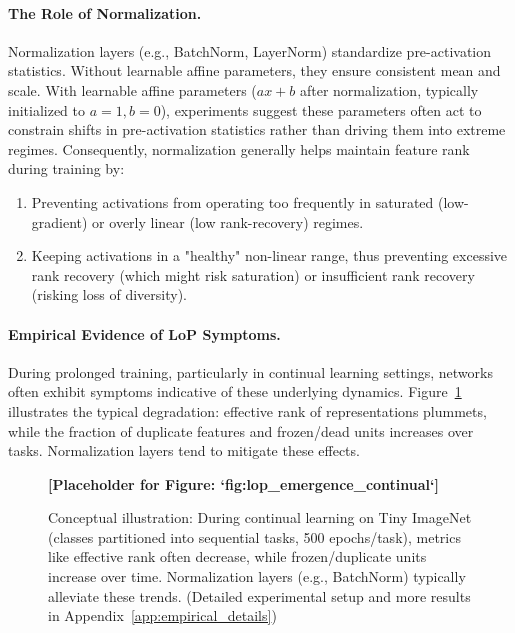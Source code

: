 \documentclass{article}
\begin{document}
\paragraph{The Role of Normalization.}
Normalization layers (e.g., BatchNorm, LayerNorm) standardize pre-activation statistics.
Without learnable affine parameters, they ensure consistent mean and scale. With learnable affine parameters ($ax+b$ after normalization, typically initialized to $a=1, b=0$), experiments suggest these parameters often act to constrain shifts in pre-activation statistics rather than driving them into extreme regimes.
Consequently, normalization generally helps maintain feature rank during training by:
\begin{enumerate}
    \item Preventing activations from operating too frequently in saturated (low-gradient) or overly linear (low rank-recovery) regimes.
    \item Keeping activations in a "healthy" non-linear range, thus preventing excessive rank recovery (which might risk saturation) or insufficient rank recovery (risking loss of diversity).
\end{enumerate}

\paragraph{Empirical Evidence of LoP Symptoms.}
During prolonged training, particularly in continual learning settings, networks often exhibit symptoms indicative of these underlying dynamics. Figure~\ref{fig:lop_emergence_continual_placeholder} illustrates the typical degradation: effective rank of representations plummets, while the fraction of duplicate features and frozen/dead units increases over tasks. Normalization layers tend to mitigate these effects.

\begin{figure}[ht!]
    \centering
    \textbf{[Placeholder for Figure: `fig:lop_emergence_continual`]}
    \caption{Conceptual illustration: During continual learning on Tiny ImageNet (classes partitioned into sequential tasks, 500 epochs/task), metrics like effective rank often decrease, while frozen/duplicate units increase over time. Normalization layers (e.g., BatchNorm) typically alleviate these trends. (Detailed experimental setup and more results in Appendix~\ref{app:empirical_details})}
    \label{fig:lop_emergence_continual_placeholder}
\end{figure}
\end{document}
